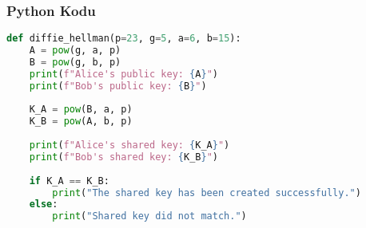 \subsubsection{Python Kodu}

\begin{lstlisting}[language=Python]
def diffie_hellman(p=23, g=5, a=6, b=15):
    A = pow(g, a, p)
    B = pow(g, b, p)
    print(f"Alice's public key: {A}")
    print(f"Bob's public key: {B}")
    
    K_A = pow(B, a, p)
    K_B = pow(A, b, p)
    
    print(f"Alice's shared key: {K_A}")
    print(f"Bob's shared key: {K_B}")
    
    if K_A == K_B:
        print("The shared key has been created successfully.")
    else:
        print("Shared key did not match.")
\end{lstlisting}

\newpage